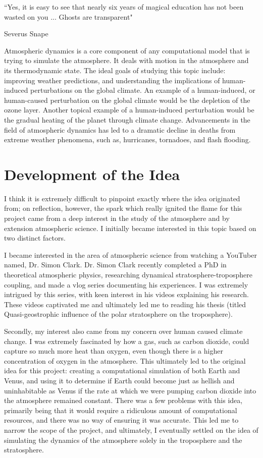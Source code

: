 \epigraph{``Yes, it is easy to see that nearly six years of magical education has not been wasted on you ... Ghosts are transparent"}{Severus Snape}

Atmospheric dynamics is a core component of any computational model that is trying to simulate the atmosphere. It deals with motion in the atmosphere and its thermodynamic state\cite{the_what}. The ideal goals of studying this topic include: improving weather predictions, and understanding the implications of human-induced perturbations on the global climate\cite{why}. An example of a human-induced, or human-caused perturbation on the global climate would be the depletion of the ozone layer\cite{perturbation}. Another topical example of a human-induced perturbation would be the gradual heating of the planet through climate change. Advancements in the field of atmospheric dynamics has led to a dramatic decline in deaths from extreme weather phenomena, such as, hurricanes, tornadoes, and flash flooding\cite{deaths}.

\section{Development of the Idea}
I think it is extremely difficult to pinpoint exactly where the idea originated from; on reflection, however, the spark which really ignited the flame for this project came from a deep interest in the study of the atmosphere and by extension atmospheric science. I initially became interested in this topic based on two distinct factors. 

I became interested in the area of atmospheric science from watching a YouTuber named, Dr. Simon Clark. Dr. Simon Clark recently completed a PhD in theoretical atmospheric physics, researching dynamical stratosphere-troposphere coupling, and made a vlog series documenting his experiences. I was extremely intrigued by this series, with keen interest in his videos explaining his research. These videos captivated me and ultimately led me to reading his thesis (titled Quasi-geostrophic influence of the polar stratosphere on the troposphere)\cite{simonclark}.

Secondly, my interest also came from my concern over human caused climate change. I was extremely fascinated by how a gas, such as carbon dioxide, could capture so much more heat than oxygen, even though there is a higher concentration of oxygen in the atmosphere. This ultimately led to the original idea for this project: creating a computational simulation of both Earth and Venus, and using it to determine if Earth could become just as hellish and uninhabitable as Venus if the rate at which we were pumping carbon dioxide into the atmosphere remained constant. There was a few problems with this idea, primarily being that it would require a ridiculous amount of computational resources, and there was no way of ensuring it was accurate. This led me to narrow the scope of the project, and ultimately, I eventually settled on the idea of simulating the dynamics of the atmosphere solely in the troposphere and the stratosphere.


